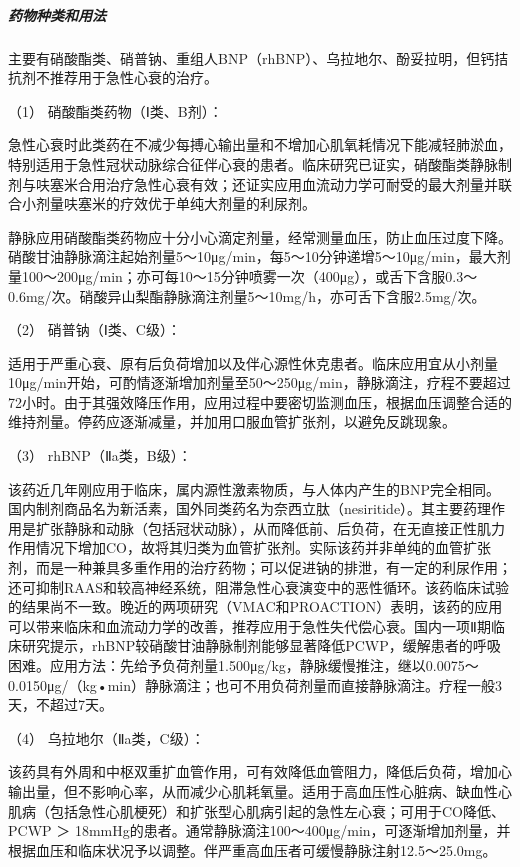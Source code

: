 \subparagraph{药物种类和用法}

主要有硝酸酯类、硝普钠、重组人BNP（rhBNP）、乌拉地尔、酚妥拉明，但钙拮抗剂不推荐用于急性心衰的治疗。

\hypertarget{text00071.htmlux5cux23CHP3-2-5-5-4-4-3-1}{}
（1） 硝酸酯类药物（Ⅰ类、B剂）：

急性心衰时此类药在不减少每搏心输出量和不增加心肌氧耗情况下能减轻肺淤血，特别适用于急性冠状动脉综合征伴心衰的患者。临床研究已证实，硝酸酯类静脉制剂与呋塞米合用治疗急性心衰有效；还证实应用血流动力学可耐受的最大剂量并联合小剂量呋塞米的疗效优于单纯大剂量的利尿剂。

静脉应用硝酸酯类药物应十分小心滴定剂量，经常测量血压，防止血压过度下降。硝酸甘油静脉滴注起始剂量5～10μg/min，每5～10分钟递增5～10μg/min，最大剂量100～200μg/min；亦可每10～15分钟喷雾一次（400μg），或舌下含服0.3～0.6mg/次。硝酸异山梨酯静脉滴注剂量5～10mg/h，亦可舌下含服2.5mg/次。

\hypertarget{text00071.htmlux5cux23CHP3-2-5-5-4-4-3-2}{}
（2） 硝普钠（Ⅰ类、C级）：

适用于严重心衰、原有后负荷增加以及伴心源性休克患者。临床应用宜从小剂量10μg/min开始，可酌情逐渐增加剂量至50～250μg/min，静脉滴注，疗程不要超过72小时。由于其强效降压作用，应用过程中要密切监测血压，根据血压调整合适的维持剂量。停药应逐渐减量，并加用口服血管扩张剂，以避免反跳现象。

\hypertarget{text00071.htmlux5cux23CHP3-2-5-5-4-4-3-3}{}
（3） rhBNP（Ⅱa类，B级）：

该药近几年刚应用于临床，属内源性激素物质，与人体内产生的BNP完全相同。国内制剂商品名为新活素，国外同类药名为奈西立肽（nesiritide）。其主要药理作用是扩张静脉和动脉（包括冠状动脉），从而降低前、后负荷，在无直接正性肌力作用情况下增加CO，故将其归类为血管扩张剂。实际该药并非单纯的血管扩张剂，而是一种兼具多重作用的治疗药物；可以促进钠的排泄，有一定的利尿作用；还可抑制RAAS和较高神经系统，阻滞急性心衰演变中的恶性循环。该药临床试验的结果尚不一致。晚近的两项研究（VMAC和PROACTION）表明，该药的应用可以带来临床和血流动力学的改善，推荐应用于急性失代偿心衰。国内一项Ⅱ期临床研究提示，rhBNP较硝酸甘油静脉制剂能够显著降低PCWP，缓解患者的呼吸困难。应用方法：先给予负荷剂量1.500μg/kg，静脉缓慢推注，继以0.0075～0.0150μg/（kg•min）静脉滴注；也可不用负荷剂量而直接静脉滴注。疗程一般3天，不超过7天。

\hypertarget{text00071.htmlux5cux23CHP3-2-5-5-4-4-3-4}{}
（4） 乌拉地尔（Ⅱa类，C级）：

该药具有外周和中枢双重扩血管作用，可有效降低血管阻力，降低后负荷，增加心输出量，但不影响心率，从而减少心肌耗氧量。适用于高血压性心脏病、缺血性心肌病（包括急性心肌梗死）和扩张型心肌病引起的急性左心衰；可用于CO降低、PCWP
＞
18mmHg的患者。通常静脉滴注100～400μg/min，可逐渐增加剂量，并根据血压和临床状况予以调整。伴严重高血压者可缓慢静脉注射12.5～25.0mg。

